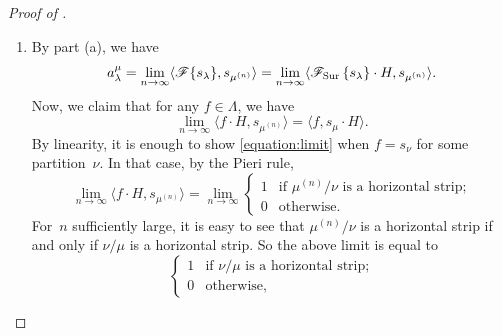 \documentclass[11pt]{article}
\theoremstyle{definition}
\numberwithin{equation}{section}
\newcommand{\Sur}{\mathchoice{\operatorname{Sur}}{\operatorname{Sur}}{\mathrm{Sur}}{\mathrm{Sur}}}
\newcommand{\F}[1]{\mathscr{F}\{#1\}}
\newcommand{\FSur}[1]{\mathscr{F}_{\Sur}\left\{#1\right\}}
\begin{document}
\begin{proof}[Proof of ]
\begin{enumerate}[label=(\alph*)]
        For the third, by  and the associativity of plethysm, we have
        \begin{align*}
            & \langle s_\lambda, s_\mu[\omega(L_1) - \omega(L_2) + \omega(L_3) - \cdots] \rangle \\
            =& \langle s_\lambda, s_\mu[-(L_1 + L_2 + L_3 + \cdots)[-p_1]] \rangle \\
            =& \langle s_\lambda, (s_\mu[-(L_1 + L_2 + L_3 + \cdots)]) [-p_1] \rangle \\
            =& \langle s_\lambda[-p_1], s_\mu[-(L_1 + L_2 + L_3 + \cdots)] \rangle \\
            =& \langle (-1)^m \omega(s_\lambda)[p_1], (-1)^n \omega(s_\mu)[L_1 + L_2 + L_3 + \cdots] \rangle \\
            =& (-1)^{m - n} \langle s_{\lambda^T}, s_{\mu^T}[L_1 + L_2 + L_3 + \cdots] \rangle 
        \end{align*}
        as desired.
        \item By part (a), we have
        \begin{equation}\label{equation:amulambda}
            a^\mu_{\lambda}
            = \lim_{n \to \infty} \langle \F{s_\lambda}, s_{\mu^{(n)}} \rangle 
            = \lim_{n \to \infty} \langle \FSur{s_\lambda} \cdot H, s_{\mu^{(n)}} \rangle.
        \end{equation}
        Now, we claim that for any $f \in \Lambda$, we have
        \begin{equation}\label{equation:limit}
            \lim_{n \to \infty} \langle f \cdot H, s_{\mu^{(n)}} \rangle = \langle f, s_\mu \cdot H \rangle.
        \end{equation}
        By linearity, it is enough to show \eqref{equation:limit} when $f = s_\nu$ for some partition~$\nu$. In that case, by the Pieri rule,
        \[
            \lim_{n \to \infty} \langle f \cdot H, s_{\mu^{(n)}} \rangle = \lim_{n \to \infty} \begin{cases} 1 & \mbox{if $\mu^{(n)}/\nu$ is a horizontal strip;} \\ 0 & \mbox{otherwise.}\end{cases}
        \]
        For~$n$ sufficiently large, it is easy to see that $\mu^{(n)}/\nu$ is a horizontal strip if and only if $\nu / \mu$ is a horizontal strip. So the above limit is equal to
        \[
            \begin{cases} 1 & \mbox{if $\nu/\mu$ is a horizontal strip;} \\ 0 & \mbox{otherwise,}\end{cases}
\]
\end{enumerate}
\end{proof}
\end{document}
